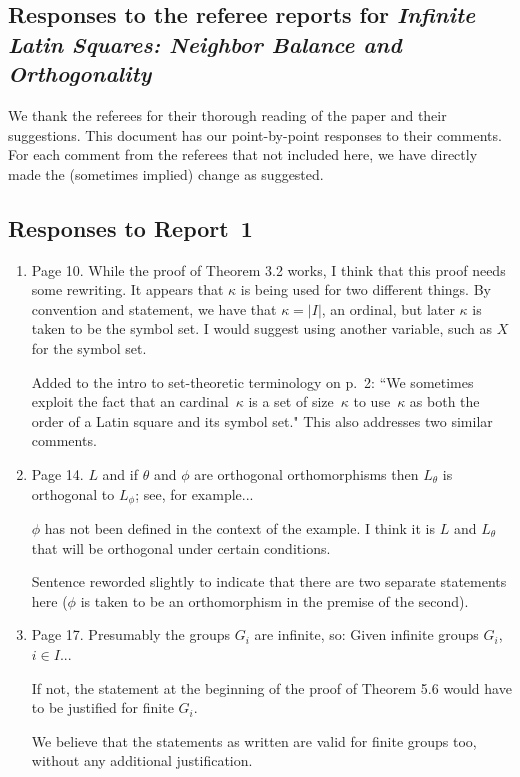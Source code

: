 \documentclass[12pt,a4paper]{article}
\newenvironment{QandA}{\begin{enumerate}[label=\bfseries\alph*.]\bfseries}
                      {\end{enumerate}}
\newenvironment{answered}{\par\normalfont}{}
\begin{document}
\subsection*{Responses to the referee reports for {\em Infinite Latin Squares: Neighbor Balance and Orthogonality}}


We thank the referees for their thorough reading of the paper and their suggestions.  This document has our point-by-point responses to their comments.  For each comment from the referees that not included here, we have directly made the (sometimes implied) change as suggested. 

\subsection*{Responses to Report~1}

\begin{QandA}

\item
Page 10.  While the proof of Theorem 3.2 works, I think that this proof needs some rewriting. It appears that $\kappa$ is being used for two different things. By convention and statement, we have that $\kappa = |I|$, an ordinal, but later $\kappa$ is taken to be the symbol set. I would suggest using another variable, such as $X$ for the symbol set.

\begin{answered}
Added to the intro to set-theoretic terminology on p.~2:  ``We sometimes exploit the fact that an cardinal~$\kappa$ is a set of size~$\kappa$ to use~$\kappa$ as both the order of a Latin square and its symbol set."  This also addresses two similar comments.
\end{answered}

\item
Page 14.
$L$ and if $\theta$ and $\phi$ are orthogonal orthomorphisms then $L_\theta$ is orthogonal to $L_\phi$; see, for example...

$\phi$ has not been defined in the context of the example. I think it is $L$  and $L_\theta$ that will be orthogonal under certain conditions.  

\begin{answered}
Sentence reworded slightly to indicate that there are two separate statements here ($\phi$ is taken to be an orthomorphism in the premise of the second).
\end{answered}

\item
Page 17.
Presumably the groups $G_i$ are infinite, so:  Given infinite groups $G_i$, $i \in I$...

If not, the statement at the beginning of the proof of Theorem 5.6 would have to be justified for finite $G_i$.

\begin{answered}
We believe that the statements as written are valid for finite groups too, without any additional justification.
\end{answered}


\end{QandA}
\end{document}
